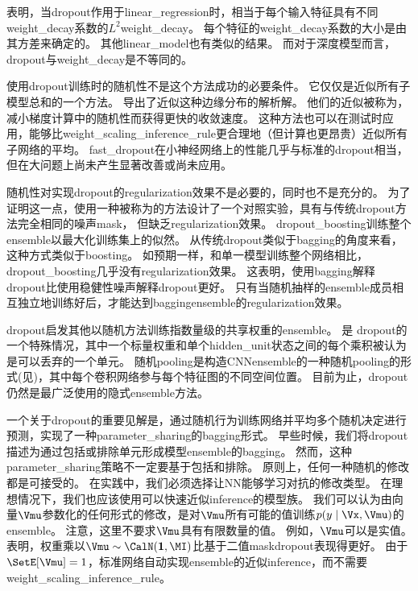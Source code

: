 \cite{Wager-et-al-2013}表明，当\gls{dropout}作用于\gls{linear_regression}时，相当于每个输入特征具有不同\gls{weight_decay}系数的$L^2$\gls{weight_decay}。 每个特征的\gls{weight_decay}系数的大小是由其方差来确定的。
其他\gls{linear_model}也有类似的结果。
而对于深度模型而言，\gls{dropout}与\gls{weight_decay}是不等同的。


使用\gls{dropout}训练时的随机性不是这个方法成功的必要条件。
它仅仅是近似所有子模型总和的一个方法。
\cite{Wang-Manning-2013}导出了近似这种边缘分布的解析解。
他们的近似被称为，减小梯度计算中的随机性而获得更快的收敛速度。
这种方法也可以在测试时应用，能够比\gls{weight_scaling_inference_rule}更合理地（但计算也更昂贵）近似所有子网络的平均。
\gls{fast_dropout}在小神经网络上的性能几乎与标准的\gls{dropout}相当，但在大问题上尚未产生显著改善或尚未应用。


随机性对实现\gls{dropout}的\gls{regularization}效果不是必要的，同时也不是充分的。
为了证明这一点，\cite{WardeFarley-et-al-2014}使用一种被称为的方法设计了一个对照实验，具有与传统\gls{dropout}方法完全相同的噪声\gls{mask}， 但缺乏\gls{regularization}效果。
\gls{dropout_boosting}训练整个\gls{ensemble}以最大化训练集上的似然。
从传统\gls{dropout}类似于\gls{bagging}的角度来看，这种方式类似于\gls{boosting}。
如预期一样，和单一模型训练整个网络相比，\gls{dropout_boosting}几乎没有\gls{regularization}效果。
这表明，使用\gls{bagging}解释\gls{dropout}比使用稳健性噪声解释\gls{dropout}更好。
只有当随机抽样的\gls{ensemble}成员相互独立地训练好后，才能达到\gls{bagging}\gls{ensemble}的\gls{regularization}效果。

\gls{dropout}启发其他以随机方法训练指数量级的共享权重的\gls{ensemble}。
是
\gls{dropout}的一个特殊情况，其中一个标量权重和单个\gls{hidden_unit}状态之间的每个乘积被认为是可以丢弃的一个单元\citep{Wan-et-al-2013}。
随机\gls{pooling}是构造\gls{CNN}\gls{ensemble}的一种随机\gls{pooling}的形式(见)，其中每个卷积网络参与每个特征图的不同空间位置。
目前为止，\gls{dropout}仍然是最广泛使用的隐式\gls{ensemble}方法。

一个关于\gls{dropout}的重要见解是，通过随机行为训练网络并平均多个随机决定进行预测，实现了一种\gls{parameter_sharing}的\gls{bagging}形式。
早些时候，我们将\gls{dropout}描述为通过包括或排除单元形成模型\gls{ensemble}的\gls{bagging}。
然而，这种\gls{parameter_sharing}策略不一定要基于包括和排除。
原则上，任何一种随机的修改都是可接受的。
在实践中，我们必须选择让\gls{NN}能够学习对抗的修改类型。
在理想情况下，我们也应该使用可以快速近似\gls{inference}的模型族。
我们可以认为由向量$\Vmu$参数化的任何形式的修改，是对$\Vmu$所有可能的值训练$p(y \mid \Vx, \Vmu)$的\gls{ensemble}。
注意，这里不要求$\Vmu$具有有限数量的值。
例如，$\Vmu$可以是实值。
\cite{Srivastava-et-al-2014}表明，权重乘以$\Vmu \sim \CalN(\mathbf{1}, \MI)$比基于二值\gls{mask}\gls{dropout}表现得更好。
由于$\SetE[\Vmu] = 1$，标准网络自动实现\gls{ensemble}的近似\gls{inference}，而不需要\gls{weight_scaling_inference_rule}。

